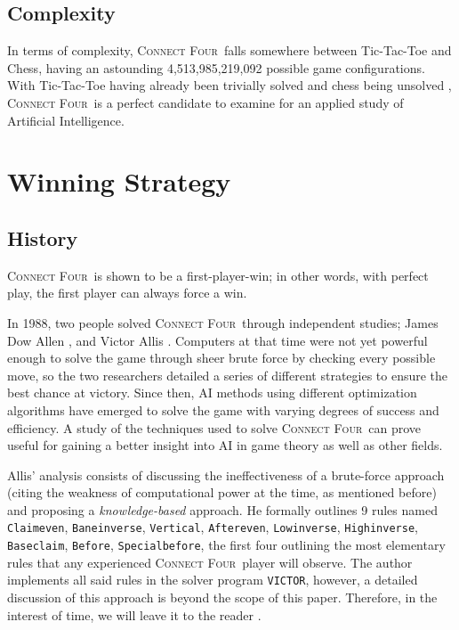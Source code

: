 \documentclass[12pt]{article}
\newcommand{\name}{\textsc{Connect Four}}
\begin{document}
\subsection{Complexity}
In terms of complexity, \name\ falls somewhere  between Tic-Tac-Toe and Chess, having an astounding 4,513,985,219,092 possible game configurations. \cite{trompnumber}
With Tic-Tac-Toe having already been trivially solved \cite{tictactoe} and chess being unsolved \cite{kumar2021can}, \name\ is a perfect candidate to examine for an applied study of Artificial Intelligence.

\section{Winning Strategy}
\subsection{History}
\name\ is shown to be a first-player-win; in other words, with perfect play, the first player can always force a win.\cite{allen_2010}

In 1988, two people solved \name\ through independent studies; James Dow Allen \cite{allen_2010}, and Victor Allis \cite{allis1988knowledge}.
Computers at that time were not yet powerful enough to solve the game through sheer brute force by checking every possible move, so the two researchers detailed a series of different strategies to ensure the best chance at victory.
Since then, AI methods using different optimization algorithms have emerged to solve the game with varying degrees of success and efficiency.
A study of the techniques used to solve \name\ can prove useful for gaining a better insight into AI in game theory as well as other fields.

Allis' analysis consists of discussing the ineffectiveness of a brute-force approach (citing the weakness of computational power at the time, as mentioned before) and proposing a \textit{knowledge-based} approach. He formally outlines 9 rules named \texttt{Claimeven}, \texttt{Baneinverse}, \texttt{Vertical}, \texttt{Aftereven}, \texttt{Lowinverse}, \texttt{Highinverse}, \texttt{Baseclaim}, \texttt{Before}, \texttt{Specialbefore}, the first four outlining the most elementary rules that any experienced \name\ player will observe. The author implements all said rules in the solver program \texttt{VICTOR}, however, a detailed discussion of this approach is beyond the scope of this paper. Therefore, in the interest of time, we will leave it to the reader \cite{allis1988knowledge}.
\end{document}
